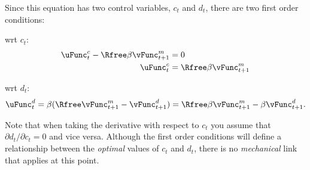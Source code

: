 \documentclass{handout}
\begin{document}
Since this equation has two control variables, $c_{t}$ and $d_{t}$, there are two
first order conditions:

wrt $c_{t}$:
\begin{equation}\begin{gathered}\begin{aligned}
        \uFunc_{t}^{c} - \Rfree\beta \vFunc^{{m}}_{t+1}& =  0 \\
    \uFunc_{t}^{c}& =  \Rfree\beta \vFunc^{{m}}_{t+1}
\end{aligned}\end{gathered}\end{equation}

wrt $d_{t}$:
\begin{equation}
\uFunc_{t}^{d} = \beta(\Rfree \vFunc_{t+1}^{{m}} - \vFunc^{d}_{t+1}) = \Rfree\beta \label{eq:ud}
\vFunc_{t+1}^{{m}}-\beta \vFunc^{d}_{t+1}.
\end{equation}

Note that when taking the derivative with respect to $c_{t}$ you 
assume that $\partial d_{t}/\partial c_{t} = 0$ and vice versa.
Although the first order conditions will define a relationship
between the {\it optimal} values of $c_{t}$ and $d_{t}$, there is
no {\it mechanical} link that applies at this point.
\end{document}
